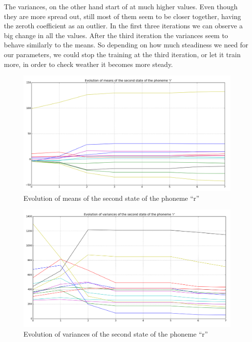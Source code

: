 \documentclass[12pt,a4paper,oneside]{article}
\begin{document}
The variances, on the other hand start of at much higher values. Even though they are more spread out, still most of them seem to be closer together, having the zeroth coefficient as an outlier. In the first three iterations we can observe a big change in all the values. After the third iteration the variances seem to behave similarly to the means. So depending on how much steadiness we need for our parameters, we could stop the training at the third iteration, or let it train more, in order to check weather it becomes more steady.

\begin{figure}[h]
\includegraphics[scale=0.4]{means.png}
\caption{Evolution of means of the second state of the phoneme ``r''}
\label{fig:means}
\end{figure}

\begin{figure}[h]
\includegraphics[scale=0.4]{variances.png}
\caption{Evolution of variances of the second state of the phoneme ``r''}
\label{fig:variances}
\end{figure}
\end{document}
